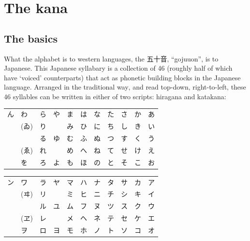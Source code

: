 \documentclass[11pt, b5paper, twoside, openright, onecolumn]{book}
\newenvironment{mytabular}[1]{\noindent\hspace{0.4in}
\begin{tabular}[h]{#1}}{\end{tabular}}
\begin{document}
\section{The kana}

\subsection{The basics}

What the alphabet is to western languages‚ the 五十音‚ “gojuuon”‚ is to Japanese. This Japanese syllabary is a collection of 46  (roughly half of which have ‘voiced’ counterparts) that act as phonetic building blocks in the Japanese language. Arranged in the traditional way‚ and read top-down‚ right-to-left‚ these 46 syllables can be written in either of two scripts: hiragana and katakana:

\vspace{0.5cm}
\smaller
\begin{mytabular}{| l  l  l  l  l  l  l  l  l  l  l |}\hline 
\rule{0pt}{2.4ex}ん & わ & ら & や & ま & は & な & た & さ & か & あ\\ 
\rule{0pt}{2.4ex} & (ゐ) & り &  & み & ひ & に & ち & し & き & い\\ 
\rule{0pt}{2.4ex} &  & る & ゆ & む & ふ & ぬ & つ & す & く & う\\ 
\rule{0pt}{2.4ex} & (ゑ) & れ &  & め & へ & ね & て & せ & け & え\\ 
\rule{0pt}{2.4ex} & を & ろ & よ & も & ほ & の & と & そ & こ & お\\ 
\hline 
\end{mytabular}
\larger
\vspace{0.5cm}

\smaller
\begin{mytabular}{| l  l  l  l  l  l  l  l  l  l  l |}\hline 
\rule{0pt}{2.4ex}ン & ワ & ラ & ヤ & マ & ハ & ナ & タ & サ & カ & ア\\ 
\rule{0pt}{2.4ex} & (ヰ) & リ &  & ミ & ヒ & ニ & チ & シ & キ & イ\\ 
\rule{0pt}{2.4ex} &  & ル & ユ & ム & フ & ヌ & ツ & ス & ク & ウ\\ 
\rule{0pt}{2.4ex} & (ヱ) & レ &  & メ & ヘ & ネ & テ & セ & ケ & エ\\ 
\rule{0pt}{2.4ex} & ヲ & ロ & ヨ & モ & ホ & ノ & ト & ソ & コ & オ\\ 
\hline 
\end{mytabular}
\larger
\vspace{0.5cm}
\end{document}
